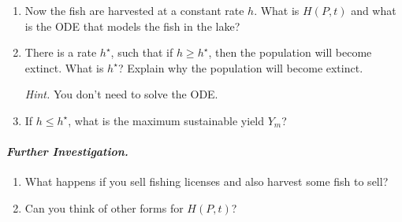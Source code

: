 \begin{enumerate}[label=\emph{(\alph*)}]
\item Now the fish are harvested at a constant rate $h$. What is $H(P,t)$ and what is the ODE that models the fish in the lake?

\item There is a rate $h^{\star}$, such that if $h \geq h^\star$, then the population will become extinct. What is $h^\star$? Explain why the population will become extinct.

\emph{Hint.} You don't need to solve the ODE.



\item If $h \leq h^\star$, what is the maximum sustainable yield $Y_m$?

\end{enumerate}



\vfill

\paragraph{\emph{Further Investigation.}} 
\begin{enumerate}[label=\emph{\arabic*.}]
\item What happens if you sell fishing licenses and also harvest some fish to sell?

\item Can you think of other forms for $H(P,t)$? 
\end{enumerate}

